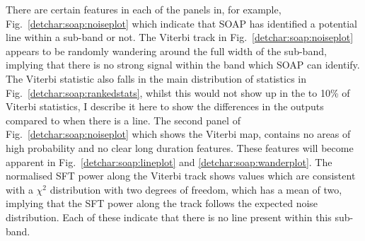 %
There are certain features in each of the panels in, for example, Fig.~\ref{detchar:soap:noiseplot} which indicate that SOAP has identified a potential line within a sub-band or not.
The Viterbi track in Fig.~\ref{detchar:soap:noiseplot} appears to be randomly wandering around the full width of the sub-band, implying that there is no strong signal within the band which SOAP can identify.
The Viterbi statistic also falls in the main distribution of statistics in Fig.~\ref{detchar:soap:rankedstats}, whilst this would not show up in the to 10\% of Viterbi statistics, I describe it here to show the differences in the outputs compared to when there is a line.
The second panel of Fig.~\ref{detchar:soap:noiseplot} which shows the Viterbi map, contains no areas of high  probability and no clear long duration features. These features will become apparent in Fig.~\ref{detchar:soap:lineplot} and \ref{detchar:soap:wanderplot}.
The normalised \gls{SFT} power along the Viterbi track shows values which are consistent with a $\chi^2$ distribution with two degrees of freedom, which has a mean of two, implying that the \gls{SFT} power along the track follows the expected noise distribution.
Each of these indicate that there is no line present within this sub-band.
%
